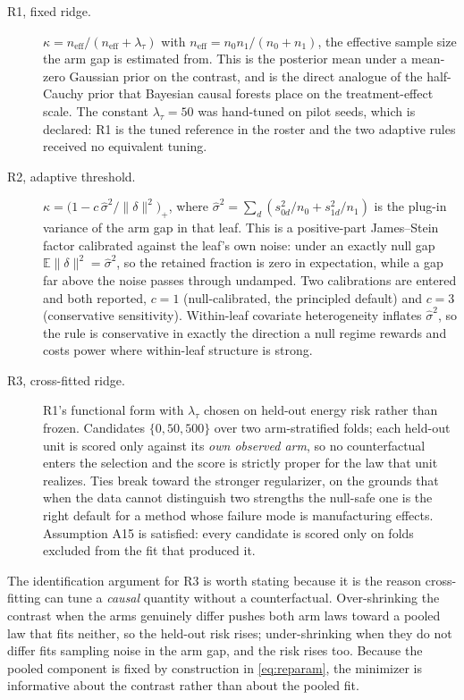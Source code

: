 \documentclass[11pt,a4paper]{article}
\theoremstyle{definition}
\theoremstyle{remark}
\newcommand{\Exp}{\mathbb{E}}
\begin{document}
\begin{description}
\item[R1, fixed ridge.] $\kappa = n_{\mathrm{eff}}/(n_{\mathrm{eff}} + \lambda_\tau)$
with $n_{\mathrm{eff}} = n_0 n_1/(n_0 + n_1)$, the effective sample size the arm
gap is estimated from. This is the posterior mean under a mean-zero Gaussian
prior on the contrast, and is the direct analogue of the half-Cauchy prior that
Bayesian causal forests place on the treatment-effect scale. The constant
$\lambda_\tau = 50$ was hand-tuned on pilot seeds, which is declared: R1 is the
tuned reference in the roster and the two adaptive rules received no equivalent
tuning.
\item[R2, adaptive threshold.]
$\kappa = \bigl(1 - c\,\hat\sigma^2/\|\delta\|^2\bigr)_+$, where
$\hat\sigma^2 = \sum_d (s_{0d}^2/n_0 + s_{1d}^2/n_1)$ is the plug-in variance of
the arm gap in that leaf. This is a positive-part James--Stein factor calibrated
against the leaf's own noise: under an exactly null gap
$\Exp\|\delta\|^2 = \hat\sigma^2$, so the retained fraction is zero in
expectation, while a gap far above the noise passes through undamped. Two
calibrations are entered and both reported, $c = 1$ (null-calibrated, the
principled default) and $c = 3$ (conservative sensitivity). Within-leaf covariate
heterogeneity inflates $\hat\sigma^2$, so the rule is conservative in exactly the
direction a null regime rewards and costs power where within-leaf structure is
strong.
\item[R3, cross-fitted ridge.] R1's functional form with $\lambda_\tau$ chosen on
held-out energy risk rather than frozen. Candidates $\{0, 50, 500\}$ over two
arm-stratified folds; each held-out unit is scored only against its \emph{own
observed arm}, so no counterfactual enters the selection and the score is
strictly proper for the law that unit realizes. Ties break toward the stronger
regularizer, on the grounds that when the data cannot distinguish two strengths
the null-safe one is the right default for a method whose failure mode is
manufacturing effects. Assumption A15 is satisfied: every candidate is scored
only on folds excluded from the fit that produced it.
\end{description}

The identification argument for R3 is worth stating because it is the reason
cross-fitting can tune a \emph{causal} quantity without a counterfactual.
Over-shrinking the contrast when the arms genuinely differ pushes both arm laws
toward a pooled law that fits neither, so the held-out risk rises;
under-shrinking when they do not differ fits sampling noise in the arm gap, and
the risk rises too. Because the pooled component is fixed by construction in
\eqref{eq:reparam}, the minimizer is informative about the contrast rather than
about the pooled fit.
\end{document}
